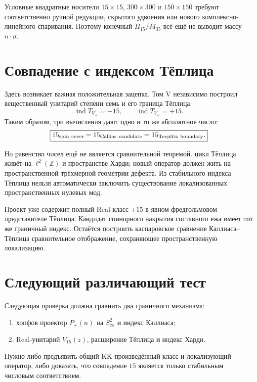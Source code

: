 Условные квадратные носители $15\times15$, $300\times300$ и
$150\times150$ требуют соответственно ручной редукции, скрытого удвоения
или нового комплексно-линейного спаривания. Поэтому конечный
$H_{15}/M_{35}$ всё ещё не выводит массу $n\cdot\sigma$.

\section{Совпадение с индексом Тёплица}

Здесь возникает важная положительная зацепка. Том V независимо построил
вещественный унитарий степени семь и его граница Тёплица:
\begin{equation}
 \operatorname{ind}T_{V_+}=-15,
 \qquad
 \operatorname{ind}T_{V_-}=+15.
 \label{eq:v6-toeplitz-callias-integer-match}
\end{equation}
Таким образом, три вычисления дают одно и то же абсолютное число:
\begin{equation}
 \boxed{
 15_{\rm spin\ cover}
 =15_{\rm Callias\ candidate}
 =15_{\rm Toeplitz\ boundary}.}
\end{equation}

Но равенство чисел ещё не является сравнительной теоремой. цикл Тёплица
живёт на $\ell^2(\mathbb Z)$ и пространстве Харди; новый оператор должен
жить на пространственной трёхмерной геометрии дефекта. Из стабильного
индекса Тёплица нельзя автоматически заключить существование
локализованных пространственных нулевых мод.

\begin{proposition}
Проект уже содержит полный Real-класс $\pm15$ в явном фредгольмовом
представителе Тёплица. Кандидат спинорного накрытия составного ежа имеет тот же
граничный индекс. Остаётся построить каспаровское сравнение Каллиаса--Тёплица
сравнительное отображение, сохраняющее пространственную локализацию.
\end{proposition}

\section{Следующий различающий тест}

Следующая проверка должна сравнить два граничного механизма:
\begin{enumerate}
 \item хопфов проектор $P_+(n)$ на $S^2_\infty$ и индекс Каллиаса;
 \item Real-унитарий $V_{15}(z)$, расширение Тёплица и индекс Харди.
\end{enumerate}
Нужно либо предъявить общий KK-произведённый класс и локализующий
оператор, либо доказать, что совпадение $15$ является только стабильным
числовым соответствием.

